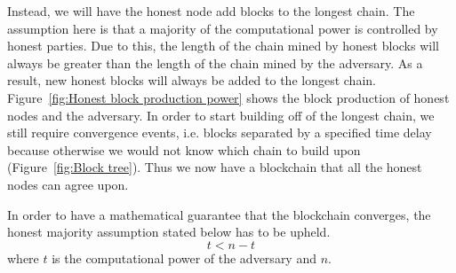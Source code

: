 Instead, we will have the honest node add blocks to the longest chain. The assumption here is that a majority of the computational power is controlled by honest parties. Due to this, the length of the chain mined by honest blocks will always be greater than the length of the chain mined by the adversary. As a result, new honest blocks will always be added to the longest chain. Figure~\ref{fig:Honest block production power} shows the block production of honest nodes and the adversary.
In order to start building off of the longest chain, we still require convergence events, i.e. blocks separated by a specified time delay because otherwise we would not know which chain to build upon (Figure~\ref{fig:Block tree}). Thus we now have a blockchain that all the honest nodes can agree upon.

In order to have a mathematical guarantee that the blockchain converges, the honest majority assumption stated below has to be upheld.
\begin{equation}
    t < n-t
\end{equation}
where
$t$ is the computational power of the adversary and $n$.

